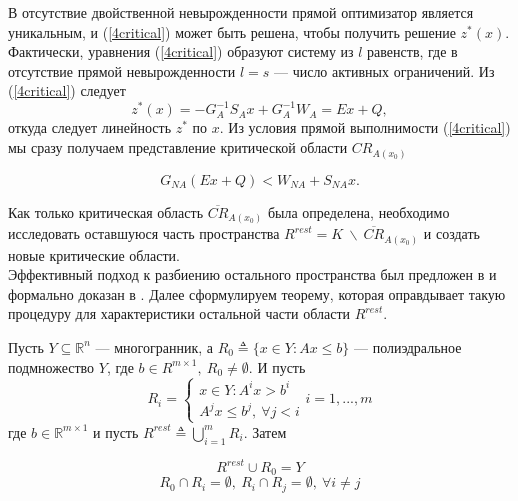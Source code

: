 В отсутствие двойственной невырожденности прямой оптимизатор является уникальным, и (\ref{4critical}) может быть решена, чтобы получить решение $z^* (x)$. Фактически, уравнения (\ref{4critical}) образуют систему из $l$ равенств, где в отсутствие прямой невырожденности $l = s$ --- число активных ограничений. Из (\ref{4critical}) следует
\begin{equation}\label{4critical}
    z^*(x) = -G^{-1}_{A} S_{A} x + G_{A}^{-1}W_A = Ex + Q,
\end{equation}
откуда следует линейность $z^*$ по $x$. Из условия прямой выполнимости (\ref{4critical}) мы сразу получаем представление критической области $CR_{A (x_0)}$

\begin{equation}\label{4critical}
    G_{NA}(Ex + Q) < W_{NA} + S_{NA}x.
\end{equation}

Как только критическая область $\overline{CR}_{A (x_0)}$ была определена, необходимо исследовать оставшуюся часть пространства $R^{rest} = K \ \backslash \ \overline{CR}_{A (x_0)}$ и создать новые критические области.\\
Эффективный подход к разбиению остального пространства был предложен в \cite{Dua57} и формально доказан в \cite{Bemporad25}. Далее сформулируем теорему, которая оправдывает такую процедуру для характеристики остальной части области $R^{rest}$.

\begin{theorem}\label{9theorem}
    Пусть $Y \subseteq \mathbb{R}^n$ --- многогранник, а $R_0 \triangleq \{x \in Y: Ax \leq b\}$ --- полиэдральное подмножество $Y$, где $b \in R^{m \times 1},\  R_0 \not = \emptyset$. И пусть
    $$R_i = 
    \begin{cases}
        x \in Y: A^{i}x > b^i\\
        A^{j}x \leq b^{j},\ \forall j < i
    \end{cases}
        i = 1,...,m
    $$
    где $b \in \mathbb{R}^{m \times 1}$ и пусть $R^{rest} \triangleq \bigcup^{m}_{i=1} R_i$. Затем

    \begin{equation}\label{1list}
        R^{rest} \cup R_0 = Y
    \end{equation}
    \begin{equation}\label{2list}
        R_0 \cap R_i = \emptyset,\ R_i \cap R_j = \emptyset,\ \forall i \not = j 
    \end{equation}

\end{theorem}

